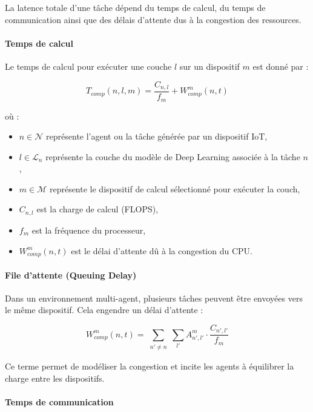 \documentclass[12pt,a4paper]{report}
\begin{document}
La latence totale d’une tâche dépend du temps de calcul, du temps de communication ainsi que des délais d’attente dus à la congestion des ressources.

\paragraph{Temps de calcul}

Le temps de calcul pour exécuter une couche $l$ sur un dispositif $m$ est donné par :

\begin{equation}
T_{comp}(n,l,m) = \frac{C_{n,l}}{f_m} + W_{comp}^m(n,t)
\end{equation}

où :
\begin{itemize}
    \item $n \in \mathcal{N}$ représente l’agent ou la tâche générée par un dispositif IoT,
    \item $l \in \mathcal{L}_n$ représente la couche du modèle de Deep Learning associée à la tâche $n$,
    \item $m \in \mathcal{M}$ représente le dispositif de calcul sélectionné pour exécuter la couch,
    \item $C_{n,l}$ est la charge de calcul (FLOPS),
    \item $f_m$ est la fréquence du processeur,
    \item $W_{comp}^m(n,t)$ est le délai d’attente dû à la congestion du CPU.
\end{itemize}

\paragraph{File d’attente (Queuing Delay)}

Dans un environnement multi-agent, plusieurs tâches peuvent être envoyées vers le même dispositif. Cela engendre un délai d’attente :

\begin{equation}
W_{comp}^m(n,t) = \sum_{\substack{n' \neq n}} \sum_{l'} A_{n',l'}^m \cdot \frac{C_{n',l'}}{f_m}
\end{equation}

Ce terme permet de modéliser la congestion et incite les agents à équilibrer la charge entre les dispositifs.

\paragraph{Temps de communication}
\end{document}
